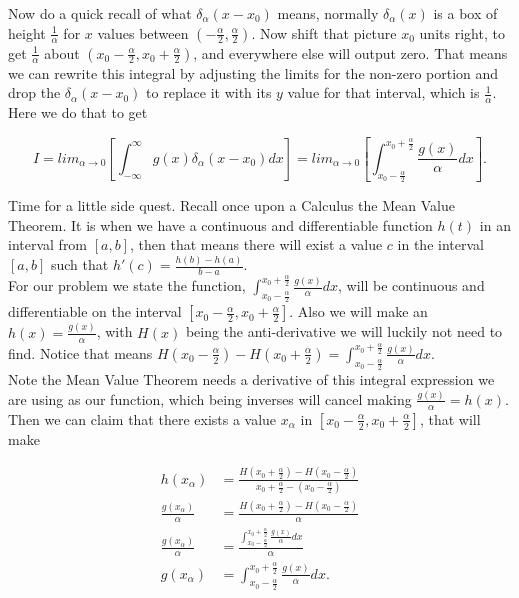 \documentclass[12pt]{article}
\begin{document}
Now do a quick recall of what $\delta_{\alpha}(x-x_0)$ means, normally $\delta_{\alpha}(x)$ is a box of height $\frac{1}{\alpha}$ for $x$ values between $\left(-\frac{\alpha}{2},\frac{\alpha}{2}\right)$. Now shift that picture $x_0$ units right, to get $\frac{1}{\alpha}$ about $\left(x_0-\frac{\alpha}{2},x_0+\frac{\alpha}{2}\right)$, and everywhere else will output zero. That means we can rewrite this integral by adjusting the limits for the non-zero portion and drop the $\delta_{\alpha}(x-x_0)$ to replace it with its $y$ value for that interval, which is $\frac{1}{\alpha}$. Here we do that to get

\begin{equation*}
    I=lim_{\alpha\rightarrow0} \left[\int_{-\infty}^{\infty} g(x) \delta_{\alpha}(x-x_0) dx\right] = lim_{\alpha\rightarrow0} \left[\int_{x_0-\frac{\alpha}{2}}^{x_0+\frac{\alpha}{2}} \frac{g(x)}{\alpha} dx\right].
\end{equation*}

Time for a little side quest. Recall once upon a  Calculus the Mean Value Theorem. It is when we have a continuous and differentiable function $h(t)$ in an interval from $[a,b]$, then that means there will exist a value $c$ in the interval $[a,b]$ such that $h'(c)=\frac{h(b)-h(a)}{b-a}$. \\

For our problem we state the function, $\int_{x_0-\frac{\alpha}{2}}^{x_0+\frac{\alpha}{2}} \frac{g(x)}{\alpha} dx$, will be continuous and differentiable on the interval $[x_0-\frac{\alpha}{2},x_0+\frac{\alpha}{2}]$. Also we will make an $h(x)=\frac{g(x)}{\alpha}$, with $H(x)$ being the anti-derivative we will luckily not need to find. Notice that means $H\left(x_0-\frac{\alpha}{2}\right)-H\left(x_0+\frac{\alpha}{2}\right)=\int_{x_0-\frac{\alpha}{2}}^{x_0+\frac{\alpha}{2}} \frac{g(x)}{\alpha} dx$. \\

Note the Mean Value Theorem needs a derivative of this integral expression we are using as our function, which being inverses will cancel making $\frac{g(x)}{\alpha}=h(x)$. Then we can claim that there exists a value $x_{\alpha}$ in $[x_0-\frac{\alpha}{2},x_0+\frac{\alpha}{2}]$, that will make

\begin{align*}
     h(x_{\alpha})&=\frac{H(x_0+\frac{\alpha}{2})-H(x_0-\frac{\alpha}{2})}{x_0+\frac{\alpha}{2}-(x_0-\frac{\alpha}{2})} \\
     \frac{g(x_{\alpha})}{\alpha} &= \frac{H(x_0+\frac{\alpha}{2})-H(x_0-\frac{\alpha}{2})}{\alpha} \\
     \frac{g(x_{\alpha})}{\alpha} &= \frac{\int_{x_0-\frac{\alpha}{2}}^{x_0+\frac{\alpha}{2}} \frac{g(x)}{\alpha} dx}{\alpha} \\
     g(x_{\alpha}) &= \int_{x_0-\frac{\alpha}{2}}^{x_0+\frac{\alpha}{2}} \frac{g(x)}{\alpha} dx.
\end{align*}
\end{document}
